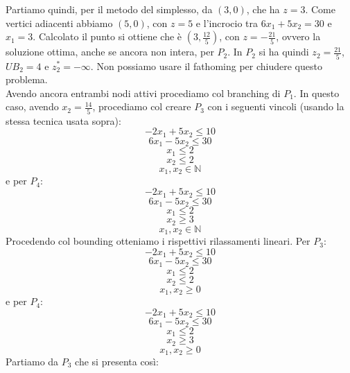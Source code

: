 \documentclass[a4paper,12pt, oneside]{book}
\begin{document}
Partiamo quindi, per il metodo del simplesso, da $(3,0)$, che ha
$z=3$. Come vertici adiacenti abbiamo $(5,0)$, con $z=5$ e l'incrocio
tra $6x_1+5x_2=30$ e $x_1=3$. Calcolato il punto si ottiene che è
$(3,\frac{12}{5})$, con $z=-\frac{21}{5}$, ovvero la soluzione ottima,
anche se ancora non intera, per $P_2$. In $P_2$ si ha quindi
$z_2=\frac{21}{5}$, $UB_2=4$ e $z_2^*=-\infty$.
Non possiamo usare il fathoming per chiudere questo problema.\\
Avendo ancora entrambi nodi attivi procediamo col branching di
$P_1$. In questo caso, avendo $x_2=\frac{14}{5}$, procediamo col creare
$P_3$ con i seguenti vincoli (usando la stessa tecnica usata sopra):
\[-2x_1+5x_2\leq 10\]
\[6x_1-5x_2\leq 30\]
\[x_1\leq 2\]
\[x_2\leq 2\]
\[x_1,x_2\in\mathbb{N}\]
e per $P_4$:
\[-2x_1+5x_2\leq 10\]
\[6x_1-5x_2\leq 30\]
\[x_1\leq 2\]
\[x_2\geq 3\]
\[x_1,x_2\in\mathbb{N}\]
\newpage
Procedendo col bounding otteniamo i rispettivi rilassamenti
lineari. Per $P_3$:
\[-2x_1+5x_2\leq 10\]
\[6x_1-5x_2\leq 30\]
\[x_1\leq 2\]
\[x_2\leq 2\]
\[x_1,x_2\geq 0\]
e per $P_4$:
\[-2x_1+5x_2\leq 10\]
\[6x_1-5x_2\leq 30\]
\[x_1\leq 2\]
\[x_2\geq 3\]
\[x_1,x_2\geq 0\]
Partiamo da $P_3$ che si presenta così:
\end{document}

